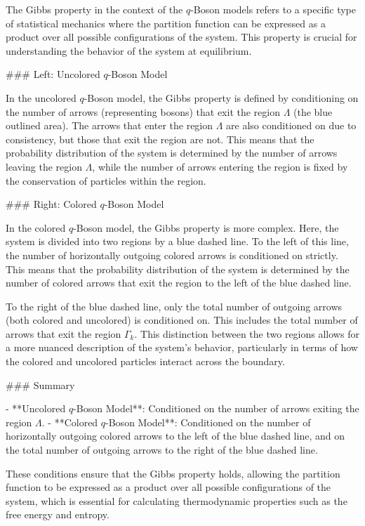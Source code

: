 The Gibbs property in the context of the $q$-Boson models refers to a specific type of statistical mechanics where the partition function can be expressed as a product over all possible configurations of the system. This property is crucial for understanding the behavior of the system at equilibrium.

### Left: Uncolored $q$-Boson Model

In the uncolored $q$-Boson model, the Gibbs property is defined by conditioning on the number of arrows (representing bosons) that exit the region $\Lambda$ (the blue outlined area). The arrows that enter the region $\Lambda$ are also conditioned on due to consistency, but those that exit the region are not. This means that the probability distribution of the system is determined by the number of arrows leaving the region $\Lambda$, while the number of arrows entering the region is fixed by the conservation of particles within the region.

### Right: Colored $q$-Boson Model

In the colored $q$-Boson model, the Gibbs property is more complex. Here, the system is divided into two regions by a blue dashed line. To the left of this line, the number of horizontally outgoing colored arrows is conditioned on strictly. This means that the probability distribution of the system is determined by the number of colored arrows that exit the region to the left of the blue dashed line. 

To the right of the blue dashed line, only the total number of outgoing arrows (both colored and uncolored) is conditioned on. This includes the total number of arrows that exit the region $\Gamma_k$. This distinction between the two regions allows for a more nuanced description of the system's behavior, particularly in terms of how the colored and uncolored particles interact across the boundary.

### Summary

- **Uncolored $q$-Boson Model**: Conditioned on the number of arrows exiting the region $\Lambda$.
- **Colored $q$-Boson Model**: Conditioned on the number of horizontally outgoing colored arrows to the left of the blue dashed line, and on the total number of outgoing arrows to the right of the blue dashed line.

These conditions ensure that the Gibbs property holds, allowing the partition function to be expressed as a product over all possible configurations of the system, which is essential for calculating thermodynamic properties such as the free energy and entropy.